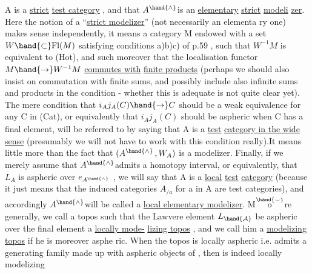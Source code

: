 
A is a \uline{strict}  \uline{test category} ,  and that $A^{\hand{\wedge}}$is an \uline{elementary} \uline{strict} \uline{modeli}%
\uline{zer}.  Here the notion of a ``\uline{strict modelizer}''  (not necessarily an elementa%
ry one)  makes sense independently,  it means a category M endowed with
a set  $W\hand{\subset} \mathrm{Fl}(M)$  satisfying conditions a)b)c) of p.59 ,  such that $W^{-1}M$
is equivalent to (Hot),  and such moreover that the localisation functor
$M\hand{\to} W^{-1}M$ \uline{commutes with} \uline{finite  products} (perhaps we should also insist on
commutation with finite sums,  and possibly include also infinite sums and
products in the condition  -  whether this is adequate is not quite clear
yet).  The mere condition  that $i_Aj_A(C)\hand{\to} C$ should be a weak equivalence
for any C in (Cat),  or equivalently that  $i_Aj_A(C)$ should be aspheric when
C has a final element,  will be referred to by saying that A is a \uline{test}
 \uline{category in the wide sense} (presumably we will not have to work with this
 condition really).It means little more than the fact that $(A^{\hand{\wedge}}\,, W_A)$ is a
modelizer.  Finally, if we merely assume that $A^{\hand{\wedge}}$admits a homotopy interval,
or equivalently,  that $L_A$ is aspheric over $e_{A^{\hand{\wedge}}}$ ,  we will say that A is
a \uline{local} \uline{test} \uline{category}  (because it just means that the induced categories
$A_{/a}$   for a in A  are test categories),  and accordingly $A^{\hand{\wedge}}$\hand{/}will be called
a \uline{local elementary modelizer}.  M\ensuremath{\overset{\hand{\scriptscriptstyle\smile}}{\mathrm{o}}}re generally,  we call a topos  \hand{/} such that
the Lawvere element $L_{\hand{\mathcal{A}}}$  be aspheric over the final element a \uline{locally mode-}%
\uline{lizing topos} ,  and we call him a \uline{modelizing topos} if he is moreover asphe%
ric.  When the topos is locally aspheric i.e. admits a generating family
made up with aspheric objects of ,  then  is indeed  \hand{/} locally modelizing
